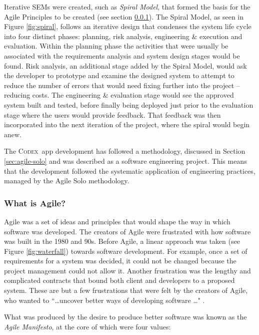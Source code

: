 \documentclass[final]{cmpreport}
\newcommand{\Codex}{\textsc{Codex}}
\begin{document}
			Iterative SEMs were created, such as \emph{Spiral Model}, that formed the basis for the Agile Principles to be created (see section \ref{sec:what-agile}). The Spiral Model, as seen in Figure \ref{fig:spiral}, follows an iterative design that condenses the system life cycle into four distinct phases: planning, risk analysis, engineering \& execution and evaluation. Within the planning phase the activities that were usually be associated with the requirements analysis and system design stages would be found. Risk analysis, an additional stage added by the Spiral Model, would ask the developer to prototype and examine the designed system to attempt to reduce the number of errors that would need fixing further into the project -- reducing costs. The engineering \& evaluation stage would see the approved system built and tested, before finally being deployed just prior to the evaluation stage where the users would provide feedback. That feedback was then incorporated into the next iteration of the project, where the spiral would begin anew.
			
			The \Codex \ app development has followed a methodology, discussed in Section \ref{sec:agile-solo} and was described as a software engineering project. This means that the development followed the systematic application of engineering practices, managed by the Agile Solo methodology.
				
			\subsubsection{What is Agile?} \label{sec:what-agile}
			Agile was a set of ideas and principles that would shape the way in which software was developed. The creators of Agile were frustrated with how software was built in the 1980 and 90s. Before Agile, a linear approach was taken (see Figure \ref{fig:waterfall}) towards software development. For example, once a set of requirements for a system was decided, it could not be changed because the project management could not allow it. Another frustration was the lengthy and complicated contracts that bound both client and developers to a proposed system. These are but a few frustrations that were felt by the creators of Agile, who wanted to ``\ldots uncover better ways of developing software \ldots" \citep{AgileManifesto}. 
			
			What was produced by the desire to produce better software was known as the \emph{Agile Manifesto}, at the core of which were four values:
			
\end{document}
